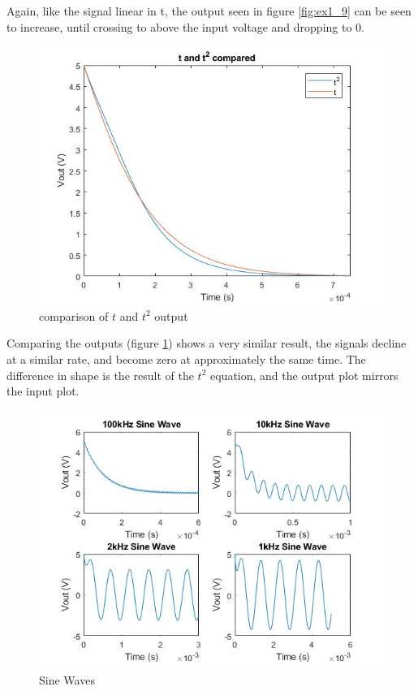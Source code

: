 \documentclass[11pt, oneside, titlepage]{article}   	%
\begin{document}
Again, like the signal linear in t, the output seen in figure \ref{fig:ex1_9} can be seen to increase, until crossing to above the input voltage and dropping to 0.


\begin{figure}[H]
\center
\includegraphics[scale = 0.5]{exercise1_10}
\caption{comparison of $t$ and $t^2$ output} \label{fig:ex1_10}
\end{figure}

Comparing the outputs (figure \ref{fig:ex1_10}) shows a very similar result, the signals decline at a similar rate, and become zero at approximately the same time. The difference in shape is the result of the $t^2$ equation, and the output plot mirrors the input plot. 

\begin{figure}[H]
\center
\includegraphics[scale = 0.5]{exercise1_11}
\caption{Sine Waves} \label{fig:ex1_11}
\end{figure}
\end{document}
